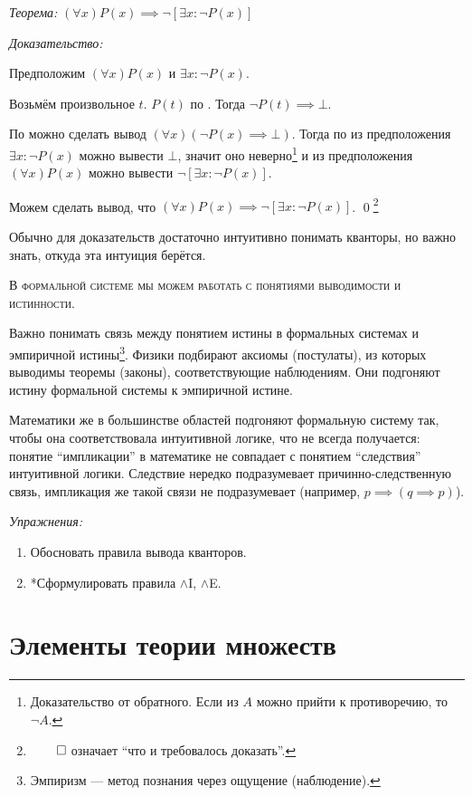 \label{wordproof}
{\it Теорема:}
$(\forall x)P(x)\implies \lnot[\exists x:\lnot P(x)]$

{\it Доказательство:}

Предположим $(\forall x)P(x)$ и $\exists x:\lnot P(x)$.

Возьмём произвольное $t$. $P(t)$ по \Aee. Тогда $\lnot P(t)\implies\bot$.

По \Aii{} можно сделать вывод $(\forall x)(\lnot P(x)\implies\bot)$.
Тогда по \Eee{} из предположения ${\exists x:\lnot P(x)}$ можно вывести $\bot$,
значит оно неверно\footnote{
	Доказательство от обратного. Если из $A$ можно прийти к противоречию, то $\lnot A$.
} и из предположения $(\forall x)P(x)$
можно вывести $\lnot[\exists x:\lnot P(x)]$.

Можем сделать вывод, что $(\forall x)P(x)\implies \lnot[\exists x:\lnot P(x)]$.
\qed\footnote{$\qed$ означает ``что и требовалось доказать''.}

Обычно для доказательств достаточно интуитивно понимать кванторы,
но важно знать, откуда эта интуиция берётся.

\textsc{В формальной системе мы можем работать с понятиями выводимости
	и истинности.}

Важно понимать связь между понятием истины в формальных системах
и эмпиричной истины\footnote{Эмпиризм --- метод познания через ощущение (наблюдение).}.
Физики подбирают аксиомы (постулаты),
из которых выводимы теоремы (законы), соответствующие наблюдениям.
Они подгоняют истину формальной системы к эмпиричной истине.

Математики же
в большинстве областей подгоняют формальную систему так,
чтобы она соответствовала интуитивной логике,
что не всегда получается: понятие ``импликации'' в математике не совпадает
с понятием ``следствия'' интуитивной логики. Следствие
нередко подразумевает причинно-следственную
связь, импликация же такой связи не подразумевает (например, ${p\implies(q\implies p)}$).

	{\it Упражнения:}

\begin{enumerate}
	\item{}Обосновать правила вывода кванторов.

	\item{}*Сформулировать правила $\land$I, $\land$E.
\end{enumerate}

\pagebreak

\section{Элементы теории множеств}

